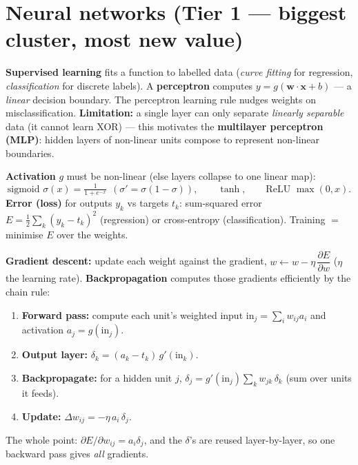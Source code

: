 \documentclass[11pt,a4paper]{article}
\begin{document}
\hrulefill

\section{Neural networks (Tier 1 --- biggest cluster, most new value)}

\begin{must}[title=From perceptron to MLP]
\textbf{Supervised learning} fits a function to labelled data (\emph{curve fitting} for regression, \emph{classification} for discrete labels). A \textbf{perceptron} computes $y=g(\mathbf w\cdot\mathbf x + b)$ --- a \emph{linear} decision boundary. The perceptron learning rule nudges weights on misclassification. \textbf{Limitation:} a single layer can only separate \emph{linearly separable} data (it cannot learn XOR) --- this motivates the \textbf{multilayer perceptron (MLP)}: hidden layers of non-linear units compose to represent non-linear boundaries.
\end{must}

\begin{must}[title=Activation \& error functions]
\textbf{Activation} $g$ must be non-linear (else layers collapse to one linear map):
\[
\text{sigmoid } \sigma(x)=\tfrac{1}{1+e^{-x}}\ \ (\sigma'=\sigma(1-\sigma)),\qquad \tanh,\qquad \text{ReLU } \max(0,x).
\]
\textbf{Error (loss)} for outputs $y_k$ vs targets $t_k$: sum-squared error $E=\tfrac12\sum_k (y_k-t_k)^2$ (regression) or cross-entropy (classification). Training $=$ minimise $E$ over the weights.
\end{must}

\begin{must}[title=Gradient descent \& backpropagation (the derivation examiners want)]
\textbf{Gradient descent:} update each weight against the gradient, $w \leftarrow w - \eta\,\dfrac{\partial E}{\partial w}$ ($\eta$ the learning rate). \textbf{Backpropagation} computes those gradients efficiently by the chain rule:
\begin{enumerate}[leftmargin=*,itemsep=0pt]
  \item \textbf{Forward pass:} compute each unit's weighted input $\mathrm{in}_j=\sum_i w_{ij}a_i$ and activation $a_j=g(\mathrm{in}_j)$.
  \item \textbf{Output layer:} $\delta_k=(a_k-t_k)\,g'(\mathrm{in}_k)$.
  \item \textbf{Backpropagate:} for a hidden unit $j$, $\delta_j=g'(\mathrm{in}_j)\sum_k w_{jk}\,\delta_k$ (sum over units it feeds).
  \item \textbf{Update:} $\Delta w_{ij}=-\eta\,a_i\,\delta_j$.
\end{enumerate}
The whole point: $\partial E/\partial w_{ij}=a_i\delta_j$, and the $\delta$'s are reused layer-by-layer, so one backward pass gives \emph{all} gradients.
\end{must}
\end{document}
